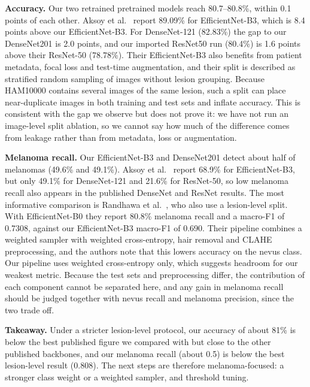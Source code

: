 \documentclass[conference]{IEEEtran}
\begin{document}
\noindent\textbf{Accuracy.} Our two retrained pretrained models reach 80.7--80.8\%, within 0.1 points of each other. Aksoy et al.~\cite{aksoy2025} report 89.09\% for EfficientNet-B3, which is 8.4 points above our EfficientNet-B3. For DenseNet-121 (82.83\%) the gap to our DenseNet201 is 2.0 points, and our imported ResNet50 run (80.4\%) is 1.6 points above their ResNet-50 (78.78\%). Their EfficientNet-B3 also benefits from patient metadata, focal loss and test-time augmentation, and their split is described as stratified random sampling of images without lesion grouping. Because HAM10000 contains several images of the same lesion, such a split can place near-duplicate images in both training and test sets and inflate accuracy. This is consistent with the gap we observe but does not prove it: we have not run an image-level split ablation, so we cannot say how much of the difference comes from leakage rather than from metadata, loss or augmentation.

\noindent\textbf{Melanoma recall.} Our EfficientNet-B3 and DenseNet201 detect about half of melanomas (49.6\% and 49.1\%). Aksoy et al.~\cite{aksoy2025} report 68.9\% for EfficientNet-B3, but only 49.1\% for DenseNet-121 and 21.6\% for ResNet-50, so low melanoma recall also appears in the published DenseNet and ResNet results.
The most informative comparison is Randhawa et al.~\cite{randhawa2026}, who also use a lesion-level split. With EfficientNet-B0 they report 80.8\% melanoma recall and a macro-F1 of 0.7308, against our EfficientNet-B3 macro-F1 of 0.690. Their pipeline combines a weighted sampler with weighted cross-entropy, hair removal and CLAHE preprocessing, and the authors note that this lowers accuracy on the nevus class. Our pipeline uses weighted cross-entropy only, which suggests headroom for our weakest metric. Because the test sets and preprocessing differ, the contribution of each component cannot be separated here, and any gain in melanoma recall should be judged together with nevus recall and melanoma precision, since the two trade off.

\noindent\textbf{Takeaway.} Under a stricter lesion-level protocol, our accuracy of about 81\% is below the best published figure we compared with but close to the other published backbones, and our melanoma recall (about 0.5) is below the best lesion-level result (0.808). The next steps are therefore melanoma-focused: a stronger class weight or a weighted sampler, and threshold tuning.
\end{document}
